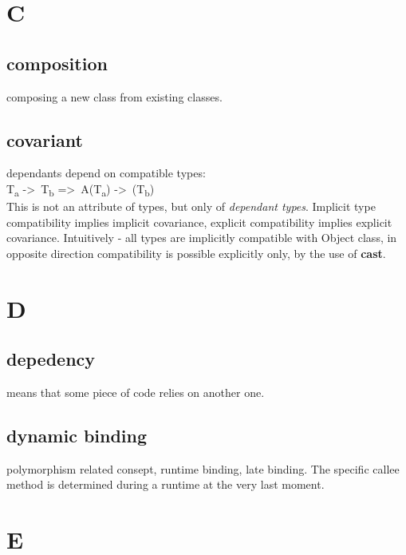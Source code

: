 \documentclass{report}
\begin{document}
\section{C}

\subsection{composition}
composing a new class from existing classes.

\subsection{covariant}
dependants depend on compatible types:\\
T\textsubscript{a} -\textgreater\  T\textsubscript{b} =\textgreater\ A(T\textsubscript{a}) -\textgreater\  (T\textsubscript{b})\\

This is not an attribute of types, but only of \textit{dependant types}.
Implicit type compatibility implies implicit covariance, explicit compatibility implies explicit covariance. Intuitively - all types are implicitly compatible with Object class,
in opposite direction compatibility is possible explicitly only, by the use of \textbf{cast}.



\section{D}

\subsection{depedency}
means that some piece of code relies on another one.

\subsection{dynamic binding}
polymorphism related consept, runtime binding, late binding. The specific callee method is determined during a runtime at the very last moment.


\section{E}
\end{document}
